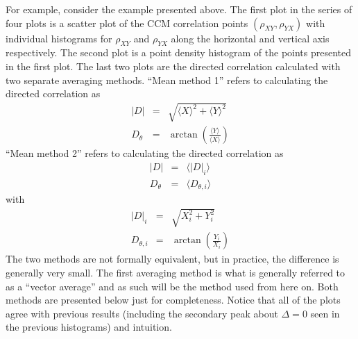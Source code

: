 \documentclass[a4paper,11pt]{article}
\begin{document}
For example, consider the example presented above.  The first plot in the series of four plots is a scatter plot of the CCM correlation points $(\rho_{XY},\rho_{YX})$ with individual histograms for $\rho_{XY}$ and $\rho_{YX}$ along the horizontal and vertical axis respectively.  The second plot is a point density histogram of the points presented in the first plot.  The last two plots are the directed correlation calculated with two separate averaging methods.  ``Mean method 1'' refers to calculating the directed correlation as
\begin{eqnarray*}
|D| &=& \sqrt{\langle X\rangle^2 + \langle Y\rangle^2}\\
D_\theta &=& \arctan\left(\frac{\langle Y\rangle}{\langle X\rangle}\right)
\end{eqnarray*}
``Mean method 2'' refers to calculating the directed correlation as
\begin{eqnarray*}
|D| &=& \langle |D|_{i} \rangle \\
D_\theta &=& \langle D_{\theta,i} \rangle
\end{eqnarray*}
with
\begin{eqnarray*}
|D|_{i} &=& \sqrt{ X_i^2 + Y_i^2}\\
D_{\theta,i} &=& \arctan\left(\frac{ Y_i }{ X_i}\right)
\end{eqnarray*}
The two methods are not formally equivalent, but in practice, the difference is generally very small.  The first averaging method is what is generally referred to as a ``vector average'' and as such will be the method used from here on.  Both methods are presented below just for completeness.  Notice that all of the plots agree with previous results (including the secondary peak about $\Delta=0$ seen in the previous histograms) and intuition.
\end{document}
